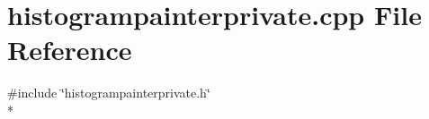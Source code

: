 \section{histogrampainterprivate.\+cpp File Reference}
\label{bk3_2curve_2painters_2histogrampainterprivate_8cpp}
{\ttfamily \#include \char`\"{}histogrampainterprivate.\+h\char`\"{}}\\*
